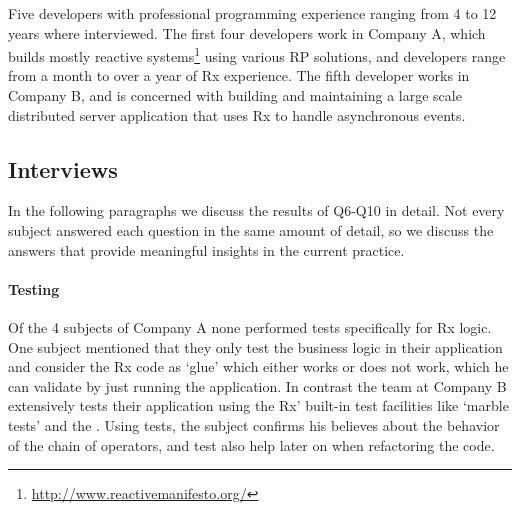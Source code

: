 Five developers with professional programming experience ranging from 4 to 12 years where interviewed.
The first four developers work in Company A, which builds mostly reactive systems\footnote{\url{http://www.reactivemanifesto.org/}} using various RP solutions,
and developers range from a month to over a year of Rx experience. 
The fifth developer works in Company B, and is concerned with building and maintaining a large scale distributed server application that uses Rx to handle asynchronous events.

\subsection{Interviews}
In the following paragraphs we discuss the results of Q6-Q10 in detail. Not every subject answered each question in the same amount of detail, so we discuss the answers that provide meaningful insights in the current practice.

\paragraph{Testing}
Of the 4 subjects of Company A none performed tests specifically for Rx logic. One subject mentioned that they only test the business logic in their application and consider the Rx code as `glue' which either works or does not work, which he can validate by just running the application. In contrast the team at Company B extensively tests their application using the Rx' built-in test facilities like `marble tests' and the . Using tests, the subject confirms his believes about the behavior of the chain of operators, and test also help later on when refactoring the code.

